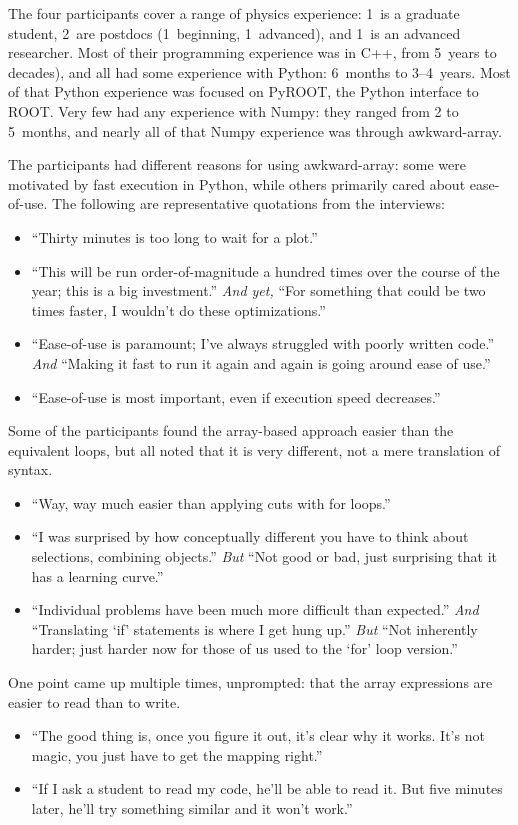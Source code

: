 \documentclass[a4paper]{jpconf}
\begin{document}
The four participants cover a range of physics experience: 1~is a graduate student, 2~are postdocs (1~beginning, 1~advanced), and 1~is an advanced researcher. Most of their programming experience was in C++, from 5~years to decades), and all had some experience with Python: 6~months to 3--4~years. Most of that Python experience was focused on PyROOT, the Python interface to ROOT. Very few had any experience with Numpy: they ranged from 2 to 5~months, and nearly all of that Numpy experience was through awkward-array.

The participants had different reasons for using awkward-array: some were motivated by fast execution in Python, while others primarily cared about ease-of-use. The following are representative quotations from the interviews:
\begin{itemize}
\item ``Thirty minutes is too long to wait for a plot.''
\item ``This will be run order-of-magnitude a hundred times over the course of the year; this is a big investment.'' {\it And yet,} ``For something that could be two times faster, I wouldn't do these optimizations.''
\item ``Ease-of-use is paramount; I've always struggled with poorly written code.'' {\it And} ``Making it fast to run it again and again is going around ease of use.''
\item ``Ease-of-use is most important, even if execution speed decreases.''
\end{itemize}

Some of the participants found the array-based approach easier than the equivalent loops, but all noted that it is very different, not a mere translation of syntax.
\begin{itemize}
\item ``Way, way much easier than applying cuts with for loops.''
\item ``I was surprised by how conceptually different you have to think about selections, combining objects.'' {\it But} ``Not good or bad, just surprising that it has a learning curve.''
\item ``Individual problems have been much more difficult than expected.'' {\it And} ``Translating `if' statements is where I get hung up.'' {\it But} ``Not inherently harder; just harder now for those of us used to the `for' loop version.''
\end{itemize}

One point came up multiple times, unprompted: that the array expressions are easier to read than to write.
\begin{itemize}
\item ``The good thing is, once you figure it out, it's clear why it works. It's not magic, you just have to get the mapping right.''
\item ``If I ask a student to read my code, he'll be able to read it. But five minutes later, he'll try something similar and it won't work.''
\end{itemize}
\end{document}
